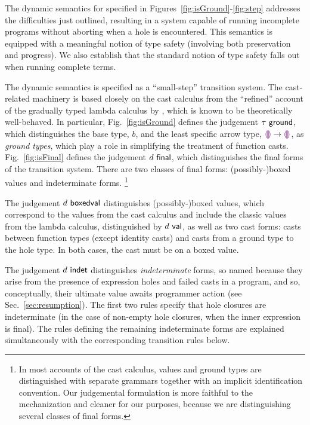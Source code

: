 The dynamic semantics for \HazelnutLive specified in Figures~\ref{fig:isGround}-\ref{fig:step} addresses the difficulties just outlined, 
resulting in a system capable of running incomplete programs without aborting when a hole is encountered. 
This semantics is equipped with a meaningful notion of type safety (involving both preservation and progress). 
We also establish that the standard notion of type safety falls out when running complete terms.

The dynamic semantics is specified as a ``small-step'' transition system. 
The cast-related machinery is based closely on the cast calculus from the ``refined'' account of the gradually typed lambda calculus by \citet{DBLP:conf/snapl/SiekVCB15}, which is known to be theoretically well-behaved. 
In particular, Fig.~\ref{fig:isGround} defines the judgement $\tau~\mathsf{ground}$, which distinguishes the base type, $b$, and the least specific arrow type, $\textcolor{violet}{\llparenthesis}\textcolor{violet}{\rrparenthesis} \rightarrow \textcolor{violet}{\llparenthesis}\textcolor{violet}{\rrparenthesis}$, as \emph{ground types}, which play a role in simplifying the treatment of function casts. 
Fig.~\ref{fig:isFinal} defines the judgement $d~\mathsf{final}$, which distinguishes the final forms of the transition system. 
There are two classes of final forms: (possibly-)boxed values and indeterminate forms.%
\footnote{In most accounts of the cast calculus, values and ground types are distinguished with separate grammars together with an implicit identification convention. 
Our judgemental formulation is more faithful to the mechanization and cleaner for our purposes, because we are distinguishing several classes of final forms.}




The judgement $d~\mathsf{boxedval}$ distinguishes (possibly-)boxed values, which correspond to the values from the cast calculus and include the classic values from the lambda calculus, distinguished by $d~\mathsf{val}$, as well as two cast forms: 
casts between function types (except identity casts) 
and casts from a ground type to the hole type. In both cases, the cast must be on a boxed value.

The judgement $d~\mathsf{indet}$ distinguishes \emph{indeterminate} forms, 
so named because they arise from the presence of expression holes and failed casts in a program, and so, conceptually, their ultimate value awaits programmer action (see Sec.~\ref{sec:resumption}). 
The first two rules specify that hole closures are indeterminate (in the case of non-empty hole closures, when the inner expression is final). 
The rules defining the remaining indeterminate forms are explained simultaneously with the corresponding transition rules below.

